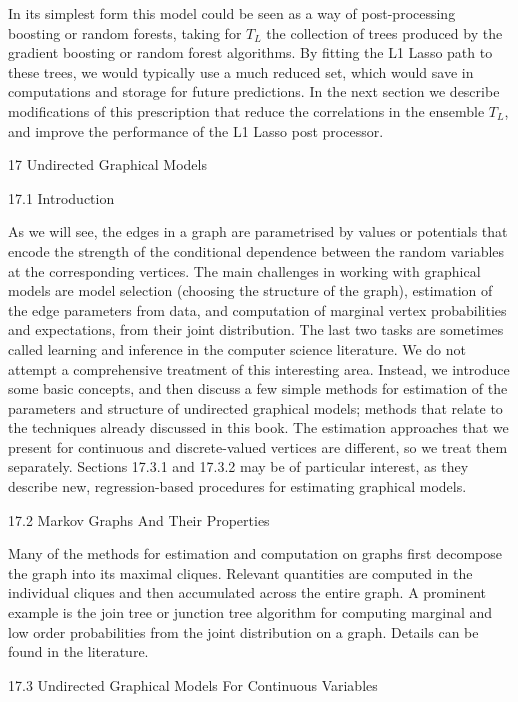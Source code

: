 In its simplest form this model could be seen as a way of post-processing boosting or random forests, taking for $T_L$ the collection of trees produced by the gradient boosting or random forest algorithms. By fitting the L1 Lasso path to these trees, we would typically use a much reduced set, which would save in computations and storage for future predictions. In the next section we describe modifications of this prescription that reduce the correlations in the ensemble $T_L$, and improve the performance of the L1 Lasso post processor.

17 Undirected Graphical Models

17.1 Introduction

As we will see, the edges in a graph are parametrised by values or potentials that encode the strength of the conditional dependence between the random variables at the corresponding vertices. The main challenges in working with graphical models are model selection (choosing the structure of the graph), estimation of the edge parameters from data, and computation of marginal vertex probabilities and expectations, from their joint distribution. The last two tasks are sometimes called learning and inference in the computer science literature. We do not attempt a comprehensive treatment of this interesting area. Instead, we introduce some basic concepts, and then discuss a few simple methods for estimation of the parameters and structure of undirected graphical models; methods that relate to the techniques already discussed in this book. The estimation approaches that we present for continuous and discrete-valued vertices are different, so we treat them separately. Sections 17.3.1 and 17.3.2 may be of particular interest, as they describe new, regression-based procedures for estimating graphical models.

17.2 Markov Graphs And Their Properties

Many of the methods for estimation and computation on graphs first decompose the graph into its maximal cliques. Relevant quantities are computed in the individual cliques and then accumulated across the entire graph. A prominent example is the join tree or junction tree algorithm for computing marginal and low order probabilities from the joint distribution on a graph. Details can be found in the literature.

17.3 Undirected Graphical Models For Continuous Variables

